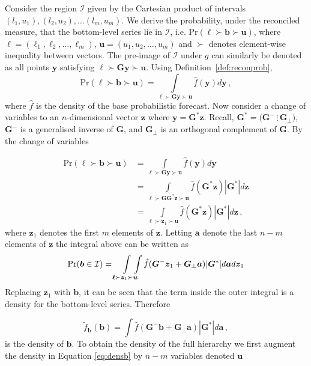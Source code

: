 \documentclass[a4paper,12pt]{article}
\theoremstyle{definition}
\begin{document}
Consider the region $\mathcal{I}$ given by the Cartesian product of intervals $(l_1,u_1),(l_2,u_2),\ldots(l_m,u_m)$. We derive the probability, under the reconciled measure, that the bottom-level series lie in $\mathcal{I}$, i.e. $\mbox{Pr}(\bm{\ell}\succ\bm{b}\succ\bm{u})$, where $\bm{\ell}=(\ell_1,\ell_2,\ldots,\ell_m)$, $\bm{u}=(u_1,u_2,\ldots,u_m)$ and $\succ$ denotes element-wise inequality between vectors. The pre-image of $\mathcal{I}$ under $g$ can similarly be denoted as all points $\bm{y}$ satisfying $\bm{\ell}\succ\bm{G}\bm{y}\succ\bm{u}$. Using Definition~\ref{def:reconprob},
\[
\mbox{Pr}(\bm{\ell}\succ\bm{b}\succ\bm{u})=\int\limits_{\bm{\ell}\succ\bm{G}\bm{y}\succ\bm{u}}\hat{f}(\bm{y})d\bm{y}\,,
\]
where $\hat{f}$ is the density of the base probabilistic forecast. Now consider a change of variables to an $n$-dimensional vector $\bm{z}$ where $\bm{y}=\bm{G}^*\bm{z}$. Recall, $\bm{G}^*=\big(\bm{G}^{-}\,\vdots\,\bm{G}_\perp\big)$, $\bm{G}^{-}$ is a generalised inverse of $\bm{G}$, and $\bm{G}_\perp$ is an orthogonal complement of $\bm{G}$. By the change of variables

\begin{align}
\mbox{Pr}(\bm{\ell}\succ\bm{b}\succ\bm{u})&=\int\limits_{\bm{\ell}\succ\bm{G}\bm{y}\succ\bm{u}}\hat{f}(\bm{y})d\bm{y}\nonumber\\
&=\int\limits_{\bm{\ell}\succ\bm{G}\bm{G}^*\bm{z}\succ\bm{u}}\hat{f}(\bm{G}^*\bm{z})|\bm{G}^*|d\bm{z}\nonumber\\
&=\int\limits_{\bm{\ell}\succ\bm{z}_1\succ\bm{u}}\hat{f}(\bm{G}^*\bm{z})|\bm{G}^*|d\bm{z}\nonumber\,,
\end{align}
where $\bm{z}_1$ denotes the first $m$ elements of $\bm{z}$. Letting $\bm{a}$ denote the last $n-m$ elements of $\bm{z}$ the integral above can be written as
\[
\mbox{Pr}(\bm{b}\in \mathcal{I})=\int\limits_{\bm{\ell}\succ\bm{z}_1\succ\bm{u}}\!\!\!\!\!\int\hat{f}(\bm{G}^{-}\bm{z}_1+\bm{G}_{\perp}\bm{a})|\bm{G}^*|d\bm{a}d\bm{z}_1\nonumber\\
\]
Replacing $\bm{z}_1$ with $\bm{b}$, it can be seen that the term inside the outer integral is a density for the bottom-level series. Therefore

\begin{equation}
\tilde{f}_{\bm{b}}(\bm{b})=\int\hat{f}(\bm{G}^{-}\bm{b}+\bm{G}_{\perp}\bm{a})|\bm{G}^*|d\bm{a}\,,
\label{eq:densb}
\end{equation}
is the density of $\bm{b}$. To obtain the density of the full hierarchy we first augment the density in Equation \eqref{eq:densb} by $n-m$ variables denoted $\bm{u}$
\end{document}
